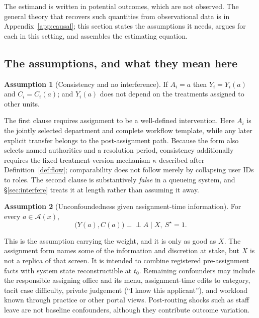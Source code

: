 \documentclass[11pt,a4paper]{article}
\theoremstyle{plain}
\theoremstyle{definition}
\newtheorem{assumption}{Assumption}
\theoremstyle{remark}
\newcommand{\indep}{\perp\!\!\!\perp}
\newcommand{\Sstar}{S^{\star}}
\begin{document}
The estimand is written in potential outcomes, which are not observed. The general theory that
recovers such quantities from observational data is in Appendix~\ref{app:causal}; this section
states the assumptions it needs, argues for each in this setting, and assembles the estimating
equation.

\subsection{The assumptions, and what they mean here}

\begin{assumption}[Consistency and no interference]\label{ass:consistency}
If $A_i=a$ then $Y_i=Y_i(a)$ and $C_i=C_i(a)$; and $Y_i(a)$ does not depend on the treatments
assigned to other units.
\end{assumption}

The first clause requires assignment to be a well-defined intervention. Here $A_i$ is the
jointly selected department and complete workflow template, while any later explicit transfer
belongs to the post-assignment path. Because the form also selects named authorities and a
resolution period, consistency additionally requires the fixed treatment-version mechanism
$\kappa$ described after Definition~\ref{def:flow}; comparability does not follow merely by
collapsing user IDs to roles. The second clause is substantively \emph{false} in a queueing
system, and \S\ref{sec:interfere} treats it at length rather than assuming it away.

\begin{assumption}[Unconfoundedness given assignment-time information]\label{ass:unconf}
For every $a\in\mathcal A(x)$,
\[
\bigl(Y(a),C(a)\bigr)\indep A\mid X,\ \Sstar=1.
\]
\end{assumption}

This is the assumption carrying the weight, and it is only as good as $X$. The assignment form
names some of the information and discretion at stake, but $X$ is not a replica of that screen.
It is intended to combine registered pre-assignment facts with system state reconstructible at
$t_0$. Remaining confounders may include the responsible assigning office and its menu,
assignment-time edits to category, tacit case difficulty, private judgement (``I know this
applicant''), and workload known through practice or other portal views. Post-routing shocks
such as staff leave are not baseline confounders, although they contribute outcome variation.
\end{document}
